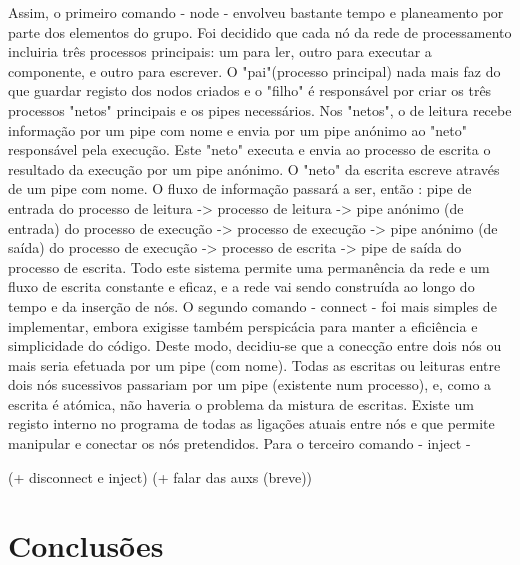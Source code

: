 \documentclass[a4paper]{article}
\begin{document}
Assim, o primeiro comando - node - envolveu bastante tempo e planeamento por parte dos elementos do grupo. Foi decidido que cada nó da rede de processamento incluiria três processos principais: um para ler, outro para executar a componente, e outro para escrever. O "pai"(processo principal) nada mais faz do que guardar registo dos nodos criados e o "filho" é responsável por criar os três processos "netos" principais e os pipes necessários. Nos "netos", o de leitura recebe informação por um pipe com nome e envia por um pipe anónimo ao "neto" responsável pela execução. Este "neto" executa e envia ao processo de escrita o resultado da execução por um pipe anónimo. O "neto" da escrita escreve através de um pipe com nome. O fluxo de informação passará a ser, então : pipe de entrada do processo de leitura -> processo de leitura -> pipe anónimo (de entrada) do processo de execução -> processo de execução -> pipe anónimo (de saída) do processo de execução -> processo de escrita -> pipe de saída do processo de escrita. Todo este sistema permite uma permanência da rede e um fluxo de escrita constante e eficaz, e a rede vai sendo construída ao longo do tempo e da inserção de nós.
O segundo comando - connect - foi mais simples de implementar, embora exigisse também perspicácia para manter a eficiência e simplicidade do código. Deste modo, decidiu-se que a conecção entre dois nós ou mais seria efetuada por um pipe (com nome). Todas as escritas ou leituras entre dois nós sucessivos passariam por um pipe (existente num processo), e, como a escrita é atómica, não haveria o problema da mistura de escritas. Existe um registo interno no programa de todas as ligações atuais entre nós e que permite manipular e conectar os nós pretendidos.
Para o terceiro comando - inject - 

(+ disconnect e inject)
(+ falar das auxs (breve))

\section{Conclusões}
\label{sec:6}
\end{document}

